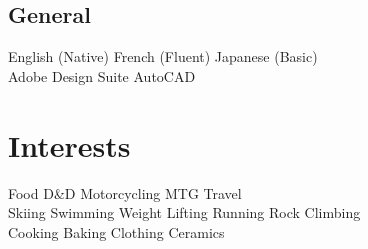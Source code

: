 \documentclass[]{willguthrie-resume}
\begin{document}
\begin{minipage}[t][][b]{0.33\textwidth}
	\subsection{General}
	English (Native) \tb French (Fluent) \tb Japanese (Basic) \\
	Adobe Design Suite \tb AutoCAD
	\sectionsep

	\section{Interests}
	Food \tb D\&D \tb Motorcycling \tb MTG \tb Travel \\
	Skiing \tb Swimming \tb Weight Lifting \tb Running \tb Rock Climbing \\
	Cooking \tb Baking \tb Clothing \tb Ceramics

\end{minipage}
\hfill
\end{document}
